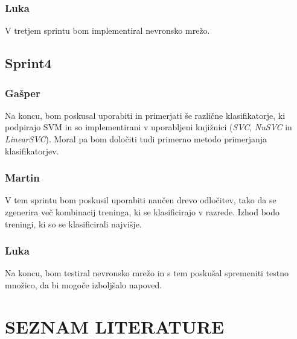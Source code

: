 \documentclass[a4paper,11pt]{article}
\begin{document}
\subsubsection{Luka}
V tretjem sprintu bom implementiral nevronsko mrežo.


\subsection{Sprint4}
\subsubsection{Gašper}
Na koncu, bom poskusal uporabiti in primerjati še različne klasifikatorje, ki podpirajo SVM in so implementirani v uporabljeni knjižnici (\textit{SVC}, \textit{NuSVC} in \textit{LinearSVC}). Moral pa bom določiti tudi primerno metodo primerjanja klasifikatorjev.
\subsubsection{Martin}
V tem sprintu bom poskusil uporabiti naučen drevo odločitev, tako da se zgenerira več kombinacij treninga, ki se klasificirajo v razrede. Izhod bodo treningi, ki so se klasificirali najvišje.

\subsubsection{Luka}
Na koncu, bom testiral nevronsko mrežo in s tem poskušal spremeniti testno množico, da bi mogoče izboljšalo napoved.


\newpage
\section{SEZNAM LITERATURE}{\baselineskip=-8pt}
\vspace{-36pt}
\renewcommand{\refname}{}
\nocite{*}

\end{document}
